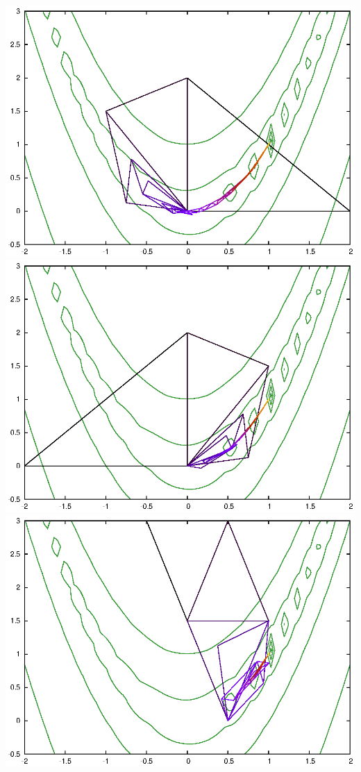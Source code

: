 \documentclass[12pt]{article}
\theoremstyle{plain}
\theoremstyle{remark}
\theoremstyle{definition}
\begin{document}
 \noindent
\includegraphics[scale=0.6]{rosenbrock1.eps}
\includegraphics[scale=0.6]{rosenbrock2.eps}
\includegraphics[scale=0.6]{rosenbrock3.eps}
\end{document}
